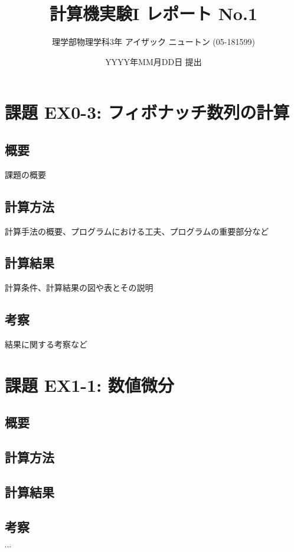 \documentclass[a4j,11pt]{jarticle}
\begin{document}
\title{計算機実験I レポート No.1}
\author{理学部物理学科3年 アイザック ニュートン (05-181599)}
\date{YYYY年MM月DD日 提出}

\maketitle

\section{課題 EX0-3: フィボナッチ数列の計算}
\subsection{概要}

課題の概要

\subsection{計算方法}

計算手法の概要、プログラムにおける工夫、プログラムの重要部分など

\subsection{計算結果}

計算条件、計算結果の図や表とその説明

\subsection{考察}

結果に関する考察など

\section{課題 EX1-1: 数値微分}

\subsection{概要}

\subsection{計算方法}

\subsection{計算結果}

\subsection{考察}

$\cdots$
\end{document}
